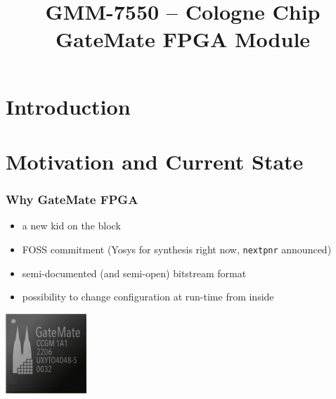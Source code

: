 
\usepackage{tikz}

\title{GMM-7550 -- Cologne Chip GateMate FPGA Module}
\subtitle{}




\begin{frame}
  \titlepage
\end{frame}

\section{Introduction}



\frame{\tableofcontents}

\section{Motivation and Current State}

\begin{frame}
  \frametitle{Why GateMate FPGA}

  \begin{itemize}
    \item a new kid on the block
    \item FOSS commitment (Yosys for synthesis right now, \texttt{nextpnr}
    announced)
    \item semi-documented (and semi-open) bitstream format
    \item possibility to change configuration at run-time from inside
  \end{itemize}

  \begin{center}
    \includegraphics[height=3cm]{CCGM1A1_front.jpg}
  \end{center}

\end{frame}

